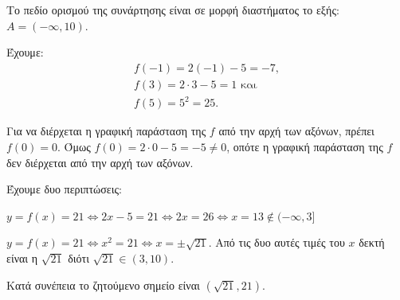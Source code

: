 
\begin{alist}
\item Το πεδίο ορισμού της συνάρτησης είναι σε μορφή διαστήματος το εξής: $A = (-\infty, 10)$.

\item Έχουμε:
\begin{gather*}
f(-1) = 2(-1) - 5 = -7, \\
f(3) = 2 \cdot 3 - 5 = 1\text{ και} \\
f(5) = 5^2 = 25.
\end{gather*}

\item Για να διέρχεται η γραφική παράσταση της $f$ από την αρχή των αξόνων, πρέπει $f(0) = 0$.
Όμως $f(0) = 2 \cdot 0 - 5 = -5 \ne 0$, οπότε η γραφική παράσταση της $f$ δεν διέρχεται από την αρχή
των αξόνων.

\item Έχουμε δυο περιπτώσεις:
\begin{bulletlist}
\item $y = f(x) = 21 \Leftrightarrow 2x - 5 = 21 \Leftrightarrow 2x = 26 \Leftrightarrow x = 13 \notin (-\infty, 3]$
\item $y = f(x) = 21 \Leftrightarrow x^2 = 21 \Leftrightarrow x = \pm \sqrt{21}$. Από τις δυο αυτές τιμές του $x$ δεκτή είναι η $\sqrt{21}$ 
διότι $\sqrt{21} \in (3, 10)$.
\end{bulletlist}
Κατά συνέπεια το ζητούμενο σημείο είναι $(\sqrt{21}, 21)$.
\end{alist}

